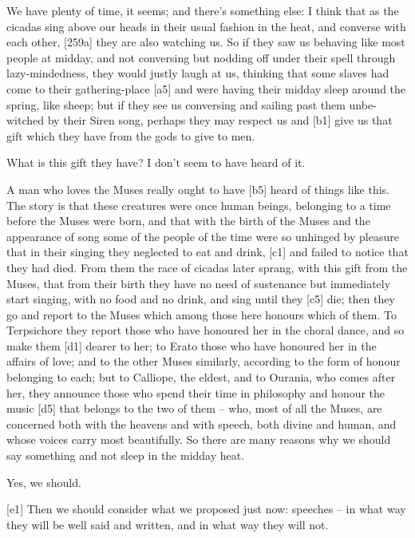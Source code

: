  We have plenty of time, it seems; and there's something else: I
think that as the cicadas sing above our heads in their usual fashion in
the heat, and converse
with each other,
{[}259a{]} they are also watching us. So if they saw us behaving like
most people at midday, and not conversing but nodding off under their
spell through lazy-mindedness, they would justly laugh at us, thinking
that some slaves had come to their gathering-place {[}a5{]} and were
having their midday sleep around the spring, like sheep; but if they see
us conversing and sailing past them unbe-witched by their Siren song,
perhaps they may respect us and {[}b1{]} give us that gift which they
have from the gods to give to men.

 What is this gift they have? I don't seem to have heard of it.

 A man who loves the Muses really ought to have {[}b5{]} heard
of things like this. The story is that these creatures were once human
beings, belonging to a time before the Muses were born, and that with
the birth of the Muses and the appearance of song some of the people of
the time were so unhinged by pleasure that in their singing they
neglected to eat and drink, {[}c1{]} and failed to notice that they had
died. From them the race of cicadas later sprang, with this gift from
the Muses, that from their birth they have no need of sustenance but
immediately start singing, with no food and no drink, and sing until
they {[}c5{]} die; then they go and report to the Muses which among
those here honours which of them. To Terpsichore they report those who
have honoured her in the choral dance, and so make them {[}d1{]} dearer
to her; to Erato those who have honoured her in the affairs of love; and
to the other Muses similarly, according to the form of honour belonging
to each; but to Calliope, the eldest, and to Ourania, who comes after
her, they announce those who spend their time in philosophy and honour
the music {[}d5{]} that belongs to the two of them -- who, most of all
the Muses, are concerned both with the heavens and with
speech, both divine and
human, and whose voices carry most beautifully. So there are many
reasons why we should say something and not sleep in the midday heat.

 Yes, we should.

{[}e1{]}  Then we should consider what we proposed just now:
speeches -- in what way they will be well said and written, and in what
way they will not.

